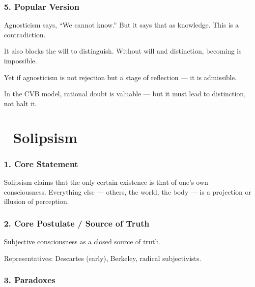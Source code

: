\documentclass[12pt]{article}
\begin{document}
\subsubsection*{5. Popular Version}

Agnosticism says, ``We cannot know.'' But it says that as knowledge. This is a contradiction.

It also blocks the will to distinguish. Without will and distinction, becoming is impossible.

Yet if agnosticism is not rejection but a stage of reflection — it is admissible.

In the CVB model, rational doubt is valuable — but it must lead to distinction, not halt it.

\section*{🔷 Solipsism}

\subsubsection*{1. Core Statement}

Solipsism claims that the only certain existence is that of one’s own consciousness. Everything else — others, the world, the body — is a projection or illusion of perception.

\subsubsection*{2. Core Postulate / Source of Truth}

Subjective consciousness as a closed source of truth.

Representatives: Descartes (early), Berkeley, radical subjectivists.

\subsubsection*{3. Paradoxes}
\end{document}
